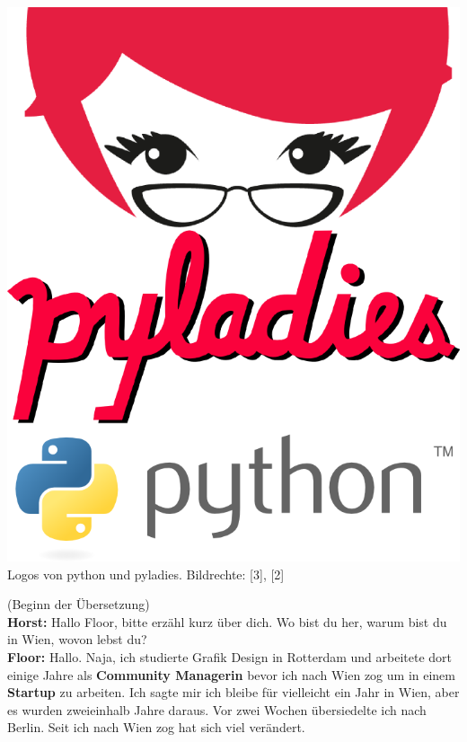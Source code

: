 \begin{center}
\includegraphics[width=\linewidth]{floor/floorlogo.png} \\
\footnotesize{Logos von python und pyladies. Bildrechte: [3], [2]}
\end{center}

(Beginn der Übersetzung) \\
\textbf{Horst:} Hallo Floor, bitte erzähl kurz über dich. Wo bist du her, warum bist du in Wien, wovon lebst du? \\
\textbf{Floor:} Hallo. Naja, ich studierte Grafik Design in Rotterdam und arbeitete dort einige Jahre als \textbf{Community Managerin} bevor ich nach Wien zog um in einem \textbf{Startup} zu arbeiten.  Ich sagte mir ich bleibe für vielleicht ein Jahr in Wien, aber es wurden zweieinhalb Jahre daraus. Vor zwei Wochen übersiedelte ich nach Berlin. Seit ich nach Wien zog hat sich viel verändert. 

